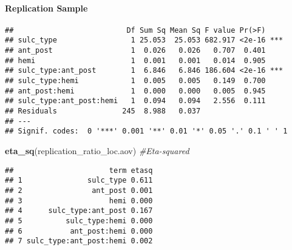 \documentclass[
]{article}
\newenvironment{Shaded}{\begin{snugshade}}{\end{snugshade}}
\newcommand{\CommentTok}[1]{\textcolor[rgb]{0.56,0.35,0.01}{\textit{#1}}}
\newcommand{\DataTypeTok}[1]{\textcolor[rgb]{0.13,0.29,0.53}{#1}}
\newcommand{\KeywordTok}[1]{\textcolor[rgb]{0.13,0.29,0.53}{\textbf{#1}}}
\newcommand{\NormalTok}[1]{#1}
\newcommand{\OperatorTok}[1]{\textcolor[rgb]{0.81,0.36,0.00}{\textbf{#1}}}
\newcommand{\StringTok}[1]{\textcolor[rgb]{0.31,0.60,0.02}{#1}}
\begin{document}
\hypertarget{replication-sample-2}{%
\paragraph{Replication Sample}\label{replication-sample-2}}

\begin{Shaded}
\end{Shaded}

\begin{verbatim}
##                          Df Sum Sq Mean Sq F value Pr(>F)    
## sulc_type                 1 25.053  25.053 682.917 <2e-16 ***
## ant_post                  1  0.026   0.026   0.707  0.401    
## hemi                      1  0.001   0.001   0.014  0.905    
## sulc_type:ant_post        1  6.846   6.846 186.604 <2e-16 ***
## sulc_type:hemi            1  0.005   0.005   0.149  0.700    
## ant_post:hemi             1  0.000   0.000   0.005  0.945    
## sulc_type:ant_post:hemi   1  0.094   0.094   2.556  0.111    
## Residuals               245  8.988   0.037                   
## ---
## Signif. codes:  0 '***' 0.001 '**' 0.01 '*' 0.05 '.' 0.1 ' ' 1
\end{verbatim}

\begin{Shaded}
\begin{Highlighting}[]
\KeywordTok{eta_sq}\NormalTok{(replication_ratio_loc.aov) }\CommentTok{#Eta-squared}
\end{Highlighting}
\end{Shaded}

\begin{verbatim}
##                      term etasq
## 1               sulc_type 0.611
## 2                ant_post 0.001
## 3                    hemi 0.000
## 4      sulc_type:ant_post 0.167
## 5          sulc_type:hemi 0.000
## 6           ant_post:hemi 0.000
## 7 sulc_type:ant_post:hemi 0.002
\end{verbatim}
\end{document}
